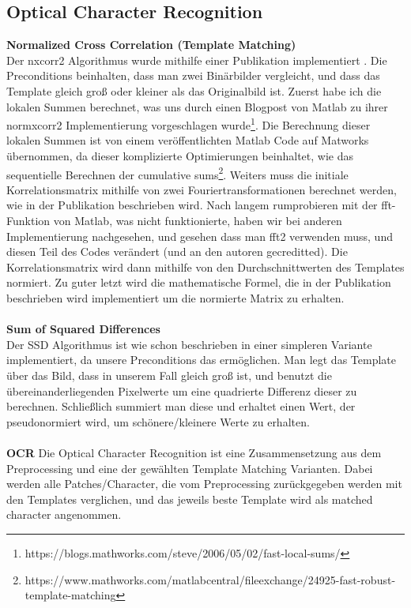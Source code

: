 \documentclass[paper=A4, deutsch]{scrartcl}
\begin{document}
\subsection{Optical Character Recognition}
\textbf{Normalized Cross Correlation (Template Matching)}\\
Der nxcorr2 Algorithmus wurde mithilfe einer Publikation implementiert \cite{nip}. Die Preconditions beinhalten, dass man zwei Binärbilder vergleicht, und dass das Template gleich groß oder kleiner als das Originalbild ist. Zuerst habe ich die lokalen Summen berechnet, was uns durch einen Blogpost von Matlab zu ihrer normxcorr2 Implementierung vorgeschlagen wurde\footnote{https://blogs.mathworks.com/steve/2006/05/02/fast-local-sums/}. Die Berechnung dieser lokalen Summen ist von einem veröffentlichten Matlab Code auf Matworks übernommen, da dieser komplizierte Optimierungen beinhaltet, wie das sequentielle Berechnen der cumulative sums\footnote{https://www.mathworks.com/matlabcentral/fileexchange/24925-fast-robust-template-matching}. Weiters muss  die initiale Korrelationsmatrix mithilfe von zwei Fouriertransformationen berechnet werden, wie in der Publikation beschrieben wird. Nach langem rumprobieren mit der fft-Funktion von Matlab, was nicht funktionierte, haben wir bei anderen Implementierung nachgesehen, und gesehen dass man fft2 verwenden muss, und diesen Teil des Codes verändert (und an den autoren gecreditted). Die Korrelationsmatrix wird dann mithilfe von den Durchschnittwerten des Templates normiert. Zu guter letzt wird die mathematische Formel, die in der Publikation beschrieben wird implementiert um die normierte Matrix zu erhalten.\\
\\
\textbf{Sum of Squared Differences}\\
Der SSD Algorithmus ist wie schon beschrieben in einer simpleren Variante implementiert, da unsere Preconditions das ermöglichen. Man legt das Template über das Bild, dass in unserem Fall gleich groß ist, und benutzt die übereinanderliegenden Pixelwerte um eine quadrierte Differenz dieser zu berechnen. Schließlich summiert man diese und erhaltet einen Wert, der pseudonormiert wird, um schönere/kleinere Werte zu erhalten.\\
\\
\textbf{OCR}
Die Optical Character Recognition ist eine Zusammensetzung aus dem Preprocessing und eine der gewählten Template Matching Varianten. Dabei werden alle Patches/Character, die vom Preprocessing zurückgegeben werden mit den Templates verglichen, und das jeweils beste Template wird als matched character angenommen.
\end{document}
